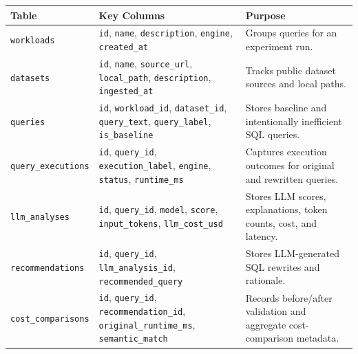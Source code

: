 {\def\LTcaptype{none} %
\begin{longtable}[]{@{}
  >{\raggedright\arraybackslash}p{}
  >{\raggedright\arraybackslash}p{}
  >{\raggedright\arraybackslash}p{}@{}}
\toprule\noalign{}
\begin{minipage}[b]{\linewidth}\raggedright
Table
\end{minipage} & \begin{minipage}[b]{\linewidth}\raggedright
Key Columns
\end{minipage} & \begin{minipage}[b]{\linewidth}\raggedright
Purpose
\end{minipage} \\
\midrule\noalign{}
\endhead
\bottomrule\noalign{}
\endlastfoot
\texttt{workloads} & \texttt{id}, \texttt{name}, \texttt{description},
\texttt{engine}, \texttt{created\_at} & Groups queries for an experiment
run. \\
\texttt{datasets} & \texttt{id}, \texttt{name}, \texttt{source\_url},
\texttt{local\_path}, \texttt{description}, \texttt{ingested\_at} &
Tracks public dataset sources and local paths. \\
\texttt{queries} & \texttt{id}, \texttt{workload\_id},
\texttt{dataset\_id}, \texttt{query\_text}, \texttt{query\_label},
\texttt{is\_baseline} & Stores baseline and intentionally inefficient
SQL queries. \\
\texttt{query\_executions} & \texttt{id}, \texttt{query\_id},
\texttt{execution\_label}, \texttt{engine}, \texttt{status},
\texttt{runtime\_ms} & Captures execution outcomes for original and
rewritten queries. \\
\texttt{llm\_analyses} & \texttt{id}, \texttt{query\_id},
\texttt{model}, \texttt{score}, \texttt{input\_tokens},
\texttt{llm\_cost\_usd} & Stores LLM scores, explanations, token counts,
cost, and latency. \\
\texttt{recommendations} & \texttt{id}, \texttt{query\_id},
\texttt{llm\_analysis\_id}, \texttt{recommended\_query} & Stores
LLM-generated SQL rewrites and rationale. \\
\texttt{cost\_comparisons} & \texttt{id}, \texttt{query\_id},
\texttt{recommendation\_id}, \texttt{original\_runtime\_ms},
\texttt{semantic\_match} & Records before/after validation and aggregate
cost-comparison metadata. \\
\end{longtable}
}


